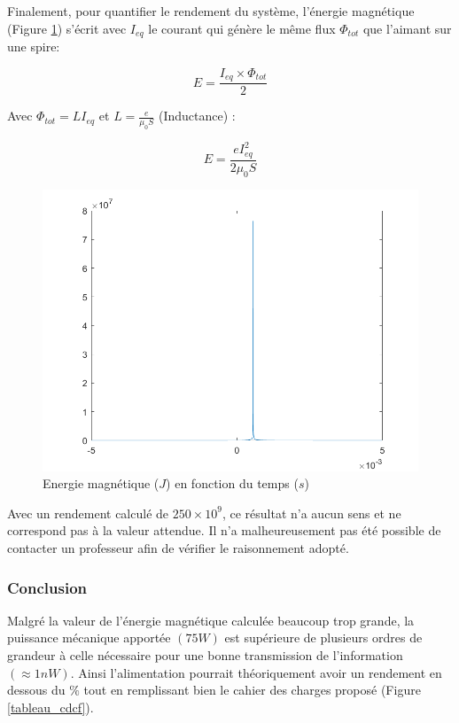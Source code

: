 \documentclass{rapportENS}
\begin{document}
 Finalement, pour quantifier le rendement du système, l'énergie magnétique (Figure \ref{energiemag}) s'écrit avec $I_{eq}$ le courant qui génère le même flux $\Phi_{tot}$ que l'aimant sur une spire:
 
 \vspace{0.1cm}
 \begin{equation}
     E = \frac{I_{eq}\times \Phi_{tot}}{2}
 \end{equation}
 \vspace{0.1cm}
 
 Avec $\Phi_{tot} = LI_{eq}$ et $L = \frac{e}{\mu_0 S}$ (Inductance) :
 
 \vspace{0.1cm}
  \begin{equation}
     E = \frac{e I_{eq}^2}{2 \mu_0 S}
 \end{equation}
 \vspace{0.1cm}
 
 \begin{figure}[h!]
 \includegraphics[width = .5\linewidth]{energiemag.png}
 \centering
 \vspace{0.5cm}
 \caption{Energie magnétique ($J$) en fonction du temps ($s$)}
 \label{energiemag}
 \end{figure}
 \vspace{0.2cm}
 
 Avec un rendement calculé de $250\times 10^{9}$, ce résultat n'a aucun sens et ne correspond pas à la valeur attendue. Il n'a malheureusement pas été possible de contacter un professeur afin de vérifier le raisonnement adopté.
 
 \subsubsection{Conclusion}
 
 Malgré la valeur de l'énergie magnétique calculée beaucoup trop grande, la puissance mécanique apportée $(75W)$ est supérieure de plusieurs ordres de grandeur à celle nécessaire pour une bonne transmission de l'information $(\approx 1nW)$. Ainsi l'alimentation pourrait théoriquement avoir un rendement en dessous du $\%$ tout en remplissant bien le cahier des charges proposé (Figure \ref{tableau_cdcf}).
 
\end{document}
